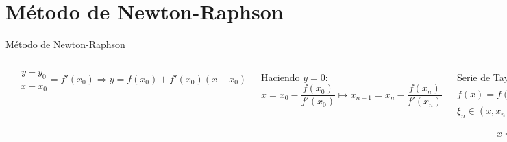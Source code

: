 \documentclass[9pt, aspectratio=169]{beamer}
\begin{document}
\section{Método de Newton-Raphson}

\begin{frame}{Método de Newton-Raphson}
	\begin{columns}[c]
		\cx
		\begin{overprint}
			 \includegraphics{figs/newton-01.pdf}
			\onslide<2-> \includegraphics{figs/newton-02.pdf}
		\end{overprint}

		\cx
		\[ \frac{y - y_0}{x - x_0} = f'(x_0) \Rightarrow  y = f(x_0) + f'(x_0) (x - x_0) \]

		Haciendo $y = 0$:
		\[x = x_0 - \frac{f(x_0)}{f'(x_0)} \mapsto  x_{n+1} = x_{n} - \frac{f(x_n)}{f'(x_n)}\]
		\pause

		\begin{overprint}
			\onslide<3> {
				Serie de Taylor ($x_n \approx x*$):
				\[f(x) = f(x_n) + (x - x_n) f'(x_n) + \frac{1}{2} (x - x_n)^2 f''(\xi) \]
				$\xi_n \in (x, x_n)$ Hacemos $f(x) = 0$:
				\[ x = x_n - \frac{f(x_n)}{f'(x_n)} - \frac{1}{2} (x - x_n)^2 \frac{f''(\xi_n)}{f'(x_n)} \]
				\[ \mapsto x_{n+1} = x_n - \frac{f(x_n)}{f'(x_n)} \]
			}
		\end{overprint}
	\end{columns}
\end{frame}
\end{document}
